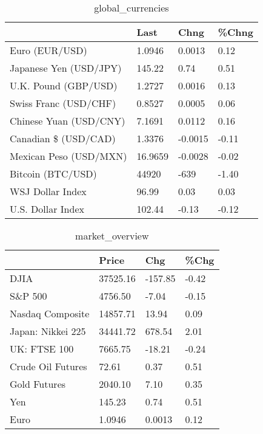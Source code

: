 \documentclass{article}%
\begin{document}
%


\begin{table}[htbp]%
\caption{global\_currencies}%
\centering%
\begin{adjustbox}{width=1\textwidth}%
\begin{tabular}{llll}
\toprule
                       &    Last &    Chng & \%Chng \\
\midrule
        Euro (EUR/USD) &  1.0946 &  0.0013 &  0.12 \\
Japanese Yen (USD/JPY) &  145.22 &    0.74 &  0.51 \\
  U.K. Pound (GBP/USD) &  1.2727 &  0.0016 &  0.13 \\
 Swiss Franc (USD/CHF) &  0.8527 &  0.0005 &  0.06 \\
Chinese Yuan (USD/CNY) &  7.1691 &  0.0112 &  0.16 \\
  Canadian \$ (USD/CAD) &  1.3376 & -0.0015 & -0.11 \\
Mexican Peso (USD/MXN) & 16.9659 & -0.0028 & -0.02 \\
     Bitcoin (BTC/USD) &   44920 &    -639 & -1.40 \\
      WSJ Dollar Index &   96.99 &    0.03 &  0.03 \\
     U.S. Dollar Index &  102.44 &   -0.13 & -0.12 \\
\bottomrule
\end{tabular}
%
\end{adjustbox}%
\end{table}

%


\begin{table}[htbp]%
\caption{market\_overview}%
\centering%
\begin{adjustbox}{width=1\textwidth}%
\begin{tabular}{llll}
\toprule
                  &    Price &     Chg &  \%Chg \\
\midrule
             DJIA & 37525.16 & -157.85 & -0.42 \\
          S\&P 500 &  4756.50 &   -7.04 & -0.15 \\
 Nasdaq Composite & 14857.71 &   13.94 &  0.09 \\
Japan: Nikkei 225 & 34441.72 &  678.54 &  2.01 \\
     UK: FTSE 100 &  7665.75 &  -18.21 & -0.24 \\
Crude Oil Futures &    72.61 &    0.37 &  0.51 \\
     Gold Futures &  2040.10 &    7.10 &  0.35 \\
              Yen &   145.23 &    0.74 &  0.51 \\
             Euro &   1.0946 &  0.0013 &  0.12 \\
\bottomrule
\end{tabular}
%
\end{adjustbox}%
\end{table}

%
\end{document}

